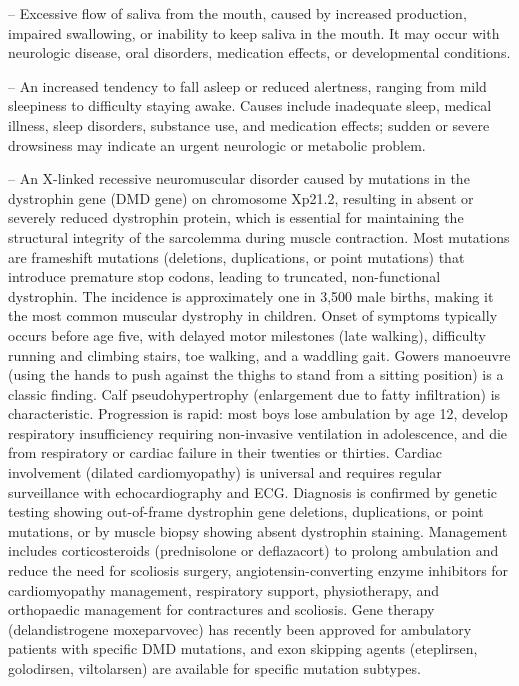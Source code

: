 -- Excessive flow of saliva from the mouth, caused by increased production, impaired swallowing, or inability to keep saliva in the mouth. It may occur with neurologic disease, oral disorders, medication effects, or developmental conditions.

-- An increased tendency to fall asleep or reduced alertness, ranging from mild sleepiness to difficulty staying awake. Causes include inadequate sleep, medical illness, sleep disorders, substance use, and medication effects; sudden or severe drowsiness may indicate an urgent neurologic or metabolic problem.

-- An X-linked recessive neuromuscular disorder caused by mutations in the dystrophin gene (DMD gene) on chromosome Xp21.2, resulting in absent or severely reduced dystrophin protein, which is essential for maintaining the structural integrity of the sarcolemma during muscle contraction. Most mutations are frameshift mutations (deletions, duplications, or point mutations) that introduce premature stop codons, leading to truncated, non-functional dystrophin. The incidence is approximately one in 3,500 male births, making it the most common muscular dystrophy in children. Onset of symptoms typically occurs before age five, with delayed motor milestones (late walking), difficulty running and climbing stairs, toe walking, and a waddling gait. Gowers manoeuvre (using the hands to push against the thighs to stand from a sitting position) is a classic finding. Calf pseudohypertrophy (enlargement due to fatty infiltration) is characteristic. Progression is rapid: most boys lose ambulation by age 12, develop respiratory insufficiency requiring non-invasive ventilation in adolescence, and die from respiratory or cardiac failure in their twenties or thirties. Cardiac involvement (dilated cardiomyopathy) is universal and requires regular surveillance with echocardiography and ECG. Diagnosis is confirmed by genetic testing showing out-of-frame dystrophin gene deletions, duplications, or point mutations, or by muscle biopsy showing absent dystrophin staining. Management includes corticosteroids (prednisolone or deflazacort) to prolong ambulation and reduce the need for scoliosis surgery, angiotensin-converting enzyme inhibitors for cardiomyopathy management, respiratory support, physiotherapy, and orthopaedic management for contractures and scoliosis. Gene therapy (delandistrogene moxeparvovec) has recently been approved for ambulatory patients with specific DMD mutations, and exon skipping agents (eteplirsen, golodirsen, viltolarsen) are available for specific mutation subtypes.

